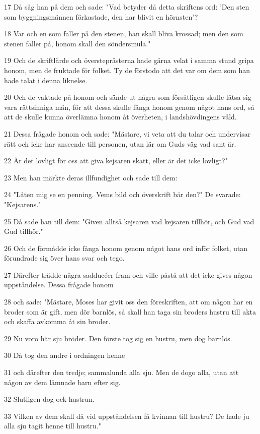 \par 17 Då såg han på dem och sade: "Vad betyder då detta skriftens ord: 'Den sten som byggningsmännen förkastade, den har blivit en hörnsten'?
\par 18 Var och en som faller på den stenen, han skall bliva krossad; men den som stenen faller på, honom skall den söndersmula."
\par 19 Och de skriftlärde och översteprästerna hade gärna velat i samma stund gripa honom, men de fruktade för folket. Ty de förstodo att det var om dem som han hade talat i denna liknelse.
\par 20 Och de vaktade på honom och sände ut några som försåtligen skulle låtsa sig vara rättsinniga män, för att dessa skulle fånga honom genom något hans ord, så att de skulle kunna överlämna honom åt överheten, i landshövdingens våld.
\par 21 Dessa frågade honom och sade: "Mästare, vi veta att du talar och undervisar rätt och icke har anseende till personen, utan lär om Guds väg vad sant är.
\par 22 Är det lovligt för oss att giva kejsaren skatt, eller är det icke lovligt?"
\par 23 Men han märkte deras illfundighet och sade till dem:
\par 24 "Låten mig se en penning. Vems bild och överskrift bär den?" De svarade: "Kejsarens."
\par 25 Då sade han till dem: "Given alltså kejsaren vad kejsaren tillhör, och Gud vad Gud tillhör."
\par 26 Och de förmådde icke fånga honom genom något hans ord inför folket, utan förundrade sig över hans svar och tego.
\par 27 Därefter trädde några sadducéer fram och ville påstå att det icke gives någon uppståndelse. Dessa frågade honom
\par 28 och sade: "Mästare, Moses har givit oss den föreskriften, att om någon har en broder som är gift, men dör barnlös, så skall han taga sin broders hustru till akta och skaffa avkomma åt sin broder.
\par 29 Nu voro här sju bröder. Den förste tog sig en hustru, men dog barnlös.
\par 30 Då tog den andre i ordningen henne
\par 31 och därefter den tredje; sammalunda alla sju. Men de dogo alla, utan att någon av dem lämnade barn efter sig.
\par 32 Slutligen dog ock hustrun.
\par 33 Vilken av dem skall då vid uppståndelsen få kvinnan till hustru? De hade ju alla sju tagit henne till hustru."
